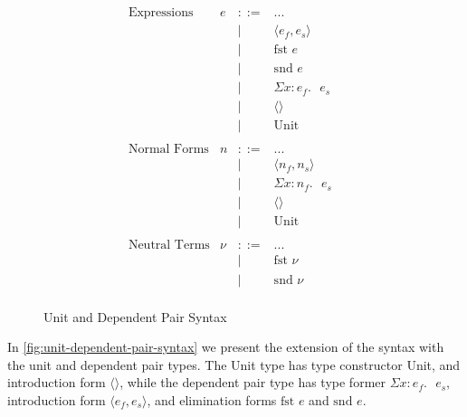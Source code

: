\documentclass[sigplan,nonacm]{acmart}
\newcommand{\bnfdef}{::=}
\newcommand{\bnfalt}{\mid}
\newcommand{\pairE}[2]{\langle #1, #2 \rangle}
\newcommand{\fstE}[1]{\text{fst } #1}
\newcommand{\sndE}[1]{\text{snd } #1}
\newcommand{\sigmaE}[3]{\Sigma #1 : #2. \text{ } #3}
\newcommand{\unitE}{\langle \rangle}
\newcommand{\unittE}{\text{Unit}}
\begin{document}
\begin{figure}[!htb]
  \begin{displaymath}
    \begin{array}{lrcll}
      \text{Expressions} & e & \bnfdef & ... & \\
      & & \bnfalt & \pairE{e_f}{e_s} & \\
      & & \bnfalt & \fstE{e} & \\
      & & \bnfalt & \sndE{e} & \\
      & & \bnfalt & \sigmaE{x}{e_f}{e_s} & \\
      & & \bnfalt & \unitE & \\
      & & \bnfalt & \unittE & \\
      \\
      \text{Normal Forms} & n & \bnfdef & ... & \\
      & & \bnfalt & \pairE{n_f}{n_s} & \\
      & & \bnfalt & \sigmaE{x}{n_f}{e_s} & \\
      & & \bnfalt & \unitE & \\
      & & \bnfalt & \unittE & \\
      \\
      \text{Neutral Terms} & \nu & \bnfdef & ... & \\
      & & \bnfalt & \fstE{\nu} & \\
      & & \bnfalt & \sndE{\nu} & \\
    \end{array}
  \end{displaymath}
  \caption{Unit and Dependent Pair Syntax}
  \label{fig:unit-dependent-pair-syntax}
\end{figure}

In \autoref{fig:unit-dependent-pair-syntax} we present the extension of the syntax with the unit and dependent pair types.
The Unit type has type constructor Unit, and introduction form $\unitE$, while the dependent pair type has type former $\sigmaE{x}{e_f}{e_s}$, introduction form $\pairE{e_f}{e_s}$, and elimination forms $\fstE{e}$ and $\sndE{e}$.
\end{document}
